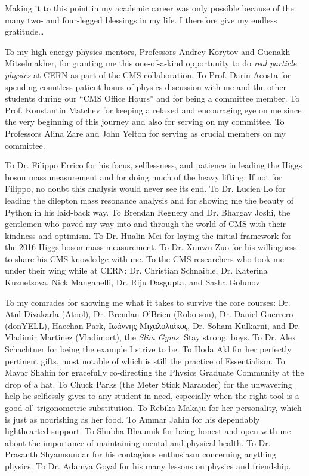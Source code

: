 Making it to this point in my academic career was only possible because of the many two- and four-legged blessings in my life.
I therefore give my endless gratitude\ldots

To my high-energy physics mentors, Professors Andrey Korytov and Guenakh Mitselmakher, for granting me this one-of-a-kind opportunity to do \emph{real particle physics} at CERN as part of the CMS collaboration.
To Prof. Darin Acosta for spending countless patient hours of physics discussion with me and the other students during our ``CMS Office Hours'' and for being a committee member.
To Prof. Konstantin Matchev for keeping a relaxed and encouraging eye on me since the very beginning of this journey and also for serving on my committee.
To Professors Alina Zare and John Yelton for serving as crucial members on my committee.

To Dr. Filippo Errico for his focus, selflessness, and patience in leading the Higgs boson mass measurement and for doing much of the heavy lifting.
If not for Filippo, no doubt this analysis would never see its end.
To Dr. Lucien Lo for leading the dilepton mass resonance analysis and for showing me the beauty of Python in his laid-back way.
To Brendan Regnery and Dr. Bhargav Joshi, the gentlemen who paved my way into and through the world of CMS with their kindness and optimism.
To Dr. Hualin Mei for laying the initial framework for the 2016 Higgs boson mass measurement.
To Dr. Xunwu Zuo for his willingness to share his CMS knowledge with me.
To the CMS researchers who took me under their wing while at CERN: Dr. Christian Schnaible, Dr. Katerina Kuznetsova, Nick Manganelli, Dr. Riju Dasgupta, and Sasha Golunov.

To my comrades for showing me what it takes to survive the core courses: Dr. Atul Divakarla (Atool), Dr. Brendan O'Brien (Robo-son), Dr. Daniel Guerrero (donYELL), Haechan Park, \textgreek{Ιωάννης Μιχαλολιάκος}, Dr. Soham Kulkarni, and Dr. Vladimir Martinez (Vladimort), \ie the \emph{Slim Gyms}. Stay strong, boys.
To Dr. Alex Schachtner for being the example I strive to be.
To Hoda Akl for her perfectly pertinent gifts, most notable of which is still the practice of Essentialism.
To Mayar Shahin for gracefully co-directing the Physics Graduate Community at the drop of a hat.
To Chuck Parks (the Meter Stick Marauder) for the unwavering help he selflessly gives to any student in need, especially when the right tool is a good ol' trigonometric substitution.
To Rebika Makaju for her personality, which is just as nourishing as her food.
To Ammar Jahin for his dependably lighthearted support.
To Shubha Bhaumik for being honest and open with me about the importance of maintaining mental and physical health.
To Dr. Prasanth Shyamsundar for his contagious enthusiasm concerning anything physics.
To Dr. Adamya Goyal for his many lessons on physics and friendship.

